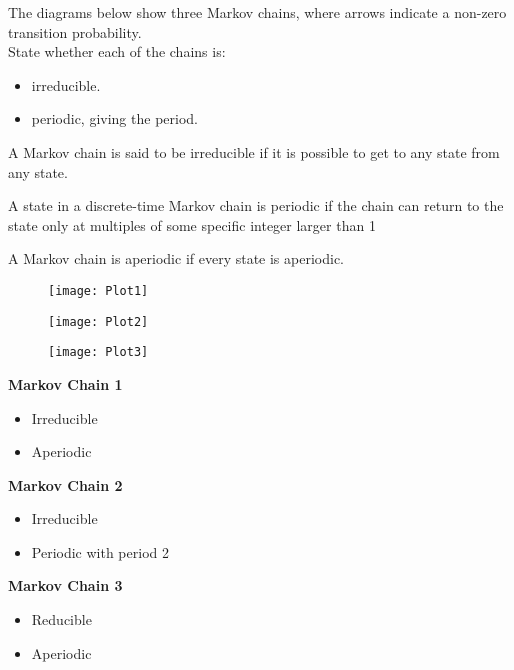 \documentclass[a4paper,12pt]{article}
\begin{document}
\large
\noindent The diagrams below show three Markov chains, where arrows indicate a non-zero
transition probability.\\ 
State whether each of the chains is:
\begin{itemize}
	\item irreducible.
	\item periodic, giving the period.
\end{itemize}
\begin{framed}
	\noindent 	
A Markov chain is said to be irreducible if it is possible to get to any state from any state. 
\end{framed}

\begin{framed}
\noindent 	A state in a discrete-time Markov chain is periodic if the chain can return to the state only at multiples of some specific integer larger than 1
\end{framed}

\begin{framed}
\noindent A Markov chain is aperiodic if every state is aperiodic.
\end{framed}
\begin{figure}[h!]
\centering
\texttt{[image: Plot1]}
\end{figure}
\begin{figure}[h!]
	\centering
	\texttt{[image: Plot2]}
\end{figure}
\begin{figure}[h!]
	\centering
	\texttt{[image: Plot3]}
\end{figure}


\newpage

\noindent \textbf{Markov Chain 1}

\begin{itemize}
\item Irreducible
\item Aperiodic

\end{itemize}



\noindent \textbf{Markov Chain 2}
\begin{itemize}
\item Irreducible
\item Periodic with period 2
\end{itemize}


\noindent \textbf{Markov Chain 3}
\begin{itemize}
	\item Reducible
	\item Aperiodic
\end{itemize}



\end{document}
